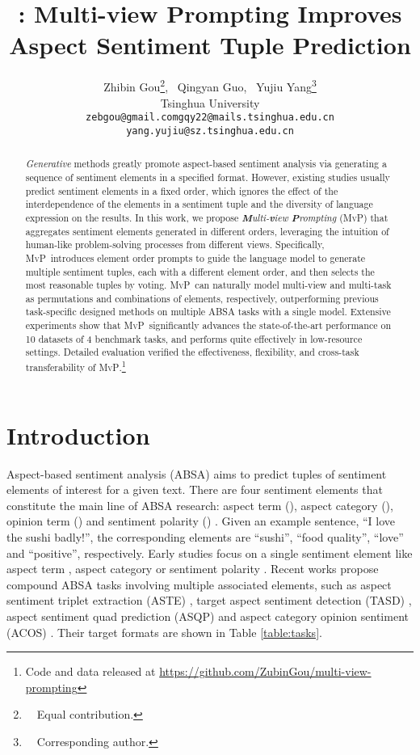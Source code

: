 \documentclass[11pt]{article}
\title{\mvp: Multi-view Prompting Improves Aspect Sentiment Tuple Prediction}
\author{Zhibin Gou\thanks{~~Equal contribution.}, ~Qingyan Guo\samethanks, ~Yujiu Yang\thanks{~~Corresponding author.}\\
   Tsinghua University \\
  \texttt{zebgou@gmail.com\quad gqy22@mails.tsinghua.edu.cn}\\
  \texttt{yang.yujiu@sz.tsinghua.edu.cn}\\}
\newcommand\mvp{\textsc{MvP}}
\begin{document}
\maketitle

\begin{abstract}


\emph{Generative} methods greatly promote aspect-based sentiment analysis via generating a sequence of sentiment elements in a specified format.
However, existing studies usually predict sentiment elements in a fixed order, which ignores the effect of the interdependence of the elements in a sentiment tuple and the diversity of language expression on the results.
In this work, we propose \emph{\textbf{M}ulti-\textbf{v}iew \textbf{P}rompting} (\mvp) that aggregates sentiment elements generated in different orders, leveraging the intuition of human-like problem-solving processes from different views.
Specifically, \mvp~introduces element order prompts to guide the language model to generate multiple sentiment tuples, each with a different element order, and then selects the most reasonable tuples by voting.
\mvp~can naturally model multi-view and multi-task as permutations and combinations of elements, respectively, outperforming previous task-specific designed methods on multiple ABSA tasks with a single model.
Extensive experiments show that \mvp~significantly advances the state-of-the-art performance on 10 datasets of 4 benchmark tasks, and performs quite effectively in low-resource settings.
Detailed evaluation verified the effectiveness, flexibility, and cross-task transferability of \mvp.\footnote{Code and data released at \url{https://github.com/ZubinGou/multi-view-prompting}}


\end{abstract}




\section{Introduction}

Aspect-based sentiment analysis (ABSA) aims to predict tuples of sentiment elements of interest for a given text. There are four sentiment elements that constitute the main line of ABSA research: aspect term (), aspect category (), opinion term () and sentiment polarity () \cite{DBLP:journals/corr/abs-2203-01054}. Given an example sentence, ``I love the sushi badly!'', the corresponding elements are ``sushi'', ``food quality'', ``love'' and ``positive'', respectively.
Early studies focus on a single sentiment element like aspect term \cite{liu-etal-2015-fine, ma-etal-2019-exploring}, aspect category \cite{DBLP:conf/aaai/ZhouWX15} or sentiment polarity \cite{wang-etal-2016-attention, chen-etal-2017-recurrent}.
Recent works propose compound ABSA tasks involving multiple associated elements, such as aspect sentiment triplet extraction (ASTE) \cite{DBLP:conf/aaai/PengXBHLS20}, target aspect sentiment detection (TASD) \cite{DBLP:conf/aaai/WanYDLQP20}, aspect sentiment quad prediction (ASQP) \cite{zhang-etal-2021-aspect} and aspect category opinion sentiment (ACOS) \cite{DBLP:conf/coling/CaiTZYX20}. Their target formats are shown in Table \ref{table:tasks}.
\end{document}
